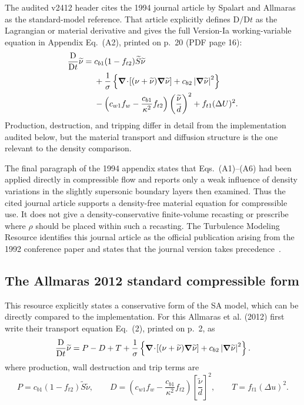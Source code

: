 The audited \SAOF{} v2412 header cites the 1994 journal article by Spalart and
Allmaras as the standard-model reference.  That article explicitly defines
\(\mathrm D/\mathrm Dt\) as the Lagrangian or material derivative and gives the
full Version-Ia working-variable equation in Appendix Eq.~(A2), printed on
p.~20 (PDF page 16):
\begin{align}
  \frac{\mathrm D}{\mathrm Dt}\widetilde{\nu}
  ={}&c_{b1}(1-f_{t2})\widetilde S\widetilde{\nu} \notag\\
  &+\frac{1}{\sigma}
   \left\{
     \boldsymbol{\nabla}\!\cdot\!\left[(\nu+\widetilde{\nu})\boldsymbol{\nabla}\widetilde{\nu}\right]
     +c_{b2}\left|\boldsymbol{\nabla}\widetilde{\nu}\right|^2
   \right\} \notag\\
  &-\left(c_{w1}f_w-\frac{c_{b1}}{\kappa^2}f_{t2}\right)
    \left(\frac{\widetilde{\nu}}{d}\right)^2
  +f_{t1}(\Delta U)^2.
  \label{eq:sa-1994-material}
\end{align}
Production, destruction, and tripping differ in detail from the implementation
audited below, but the material transport and diffusion structure is the one
relevant to the density comparison.

The final paragraph of the 1994 appendix states that Eqs.~(A1)--(A6) had been
applied directly in compressible flow and reports only a weak influence of
density variations in the slightly supersonic boundary layers then examined.
Thus the cited journal article supports a density-free material equation for
compressible use.  It does not give a density-conservative finite-volume
recasting or prescribe where \(\rho\) should be placed within such a recasting.
The Turbulence Modeling Resource identifies this journal article as the
official publication arising from the 1992 conference paper and states that
the journal version takes precedence~\cite{SpalartAllmaras1994,NASATMRSA}.

\subsection{The Allmaras 2012 standard compressible form}
This resource explicitly states a conservative form of the SA model, which can be directly compared to the \SAOF{} implementation.
For this Allmaras et al. (2012) first write their transport equation Eq.~(2), printed on p.~2, as
\begin{equation}
  \frac{\mathrm D}{\mathrm Dt}\widetilde{\nu}
  =P-D+T
  +\frac{1}{\sigma}
   \left\{
     \boldsymbol{\nabla}\!\cdot\!\left[(\nu+\widetilde{\nu})\boldsymbol{\nabla}\widetilde{\nu}\right]
     +c_{b2}\left|\boldsymbol{\nabla}\widetilde{\nu}\right|^2
   \right\}.
  \label{eq:sa-paper-material}
\end{equation}
where production, wall destruction and trip terms are
\begin{equation*}
  P=c_{b1}(1-f_{t2})\widetilde{S}\widetilde{\nu},
  \qquad
  D=\left(c_{w1}f_w-\frac{c_{b1}}{\kappa^2}f_{t2}\right)
    \left[\frac{\widetilde{\nu}}{d}\right]^2,
  \qquad
  T=f_{t1}(\Delta u)^2.
\end{equation*}

